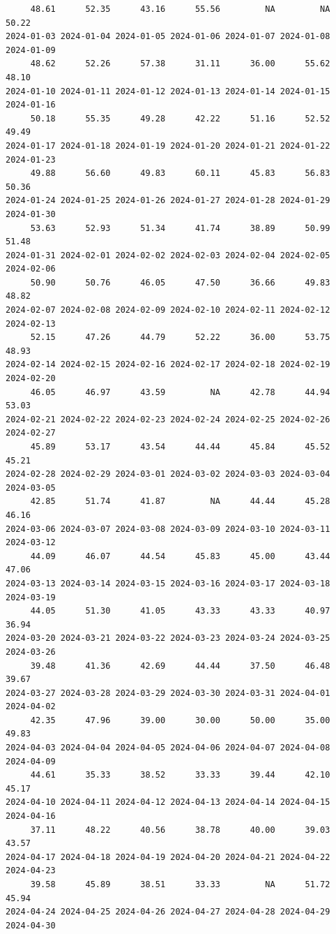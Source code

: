 \documentclass[
  letterpaper,
  DIV=11,
  numbers=noendperiod]{scrartcl}
\begin{document}
\begin{verbatim}
     48.61      52.35      43.16      55.56         NA         NA      50.22 
2024-01-03 2024-01-04 2024-01-05 2024-01-06 2024-01-07 2024-01-08 2024-01-09 
     48.62      52.26      57.38      31.11      36.00      55.62      48.10 
2024-01-10 2024-01-11 2024-01-12 2024-01-13 2024-01-14 2024-01-15 2024-01-16 
     50.18      55.35      49.28      42.22      51.16      52.52      49.49 
2024-01-17 2024-01-18 2024-01-19 2024-01-20 2024-01-21 2024-01-22 2024-01-23 
     49.88      56.60      49.83      60.11      45.83      56.83      50.36 
2024-01-24 2024-01-25 2024-01-26 2024-01-27 2024-01-28 2024-01-29 2024-01-30 
     53.63      52.93      51.34      41.74      38.89      50.99      51.48 
2024-01-31 2024-02-01 2024-02-02 2024-02-03 2024-02-04 2024-02-05 2024-02-06 
     50.90      50.76      46.05      47.50      36.66      49.83      48.82 
2024-02-07 2024-02-08 2024-02-09 2024-02-10 2024-02-11 2024-02-12 2024-02-13 
     52.15      47.26      44.79      52.22      36.00      53.75      48.93 
2024-02-14 2024-02-15 2024-02-16 2024-02-17 2024-02-18 2024-02-19 2024-02-20 
     46.05      46.97      43.59         NA      42.78      44.94      53.03 
2024-02-21 2024-02-22 2024-02-23 2024-02-24 2024-02-25 2024-02-26 2024-02-27 
     45.89      53.17      43.54      44.44      45.84      45.52      45.21 
2024-02-28 2024-02-29 2024-03-01 2024-03-02 2024-03-03 2024-03-04 2024-03-05 
     42.85      51.74      41.87         NA      44.44      45.28      46.16 
2024-03-06 2024-03-07 2024-03-08 2024-03-09 2024-03-10 2024-03-11 2024-03-12 
     44.09      46.07      44.54      45.83      45.00      43.44      47.06 
2024-03-13 2024-03-14 2024-03-15 2024-03-16 2024-03-17 2024-03-18 2024-03-19 
     44.05      51.30      41.05      43.33      43.33      40.97      36.94 
2024-03-20 2024-03-21 2024-03-22 2024-03-23 2024-03-24 2024-03-25 2024-03-26 
     39.48      41.36      42.69      44.44      37.50      46.48      39.67 
2024-03-27 2024-03-28 2024-03-29 2024-03-30 2024-03-31 2024-04-01 2024-04-02 
     42.35      47.96      39.00      30.00      50.00      35.00      49.83 
2024-04-03 2024-04-04 2024-04-05 2024-04-06 2024-04-07 2024-04-08 2024-04-09 
     44.61      35.33      38.52      33.33      39.44      42.10      45.17 
2024-04-10 2024-04-11 2024-04-12 2024-04-13 2024-04-14 2024-04-15 2024-04-16 
     37.11      48.22      40.56      38.78      40.00      39.03      43.57 
2024-04-17 2024-04-18 2024-04-19 2024-04-20 2024-04-21 2024-04-22 2024-04-23 
     39.58      45.89      38.51      33.33         NA      51.72      45.94 
2024-04-24 2024-04-25 2024-04-26 2024-04-27 2024-04-28 2024-04-29 2024-04-30 

\end{verbatim}
\end{document}
